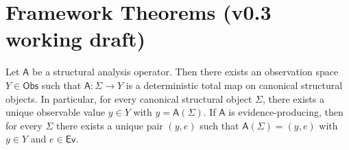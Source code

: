 \section*{Framework Theorems (v0.3 working draft)}

\begin{proposition}
\label{prop:typed-well-formedness}
Let $\mathsf A$ be a structural analysis operator. Then there exists an observation space $Y\in\mathsf{Obs}$ such that $\mathsf A: \Sigma\to Y$ is a deterministic total map on canonical structural objects. In particular, for every canonical structural object $\Sigma$, there exists a unique observable value $y\in Y$ with $y=\mathsf A(\Sigma)$. If $\mathsf A$ is evidence-producing, then for every $\Sigma$ there exists a unique pair $(y,e)$ such that $\mathsf A(\Sigma)=(y,e)$ with $y\in Y$ and $e\in\mathsf{Ev}$.

\end{proposition}

